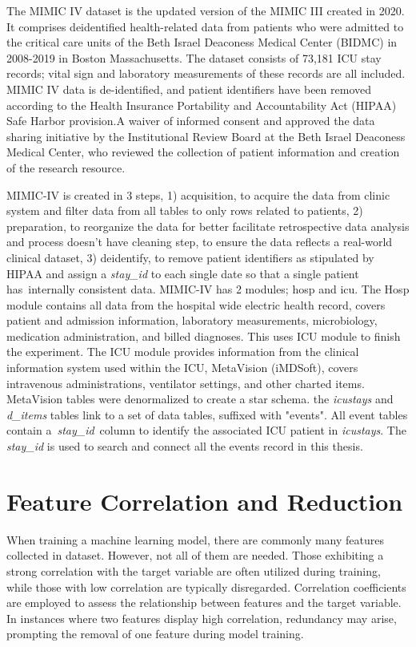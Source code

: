 \documentclass[12pt,a4paper,english
]{tunithesis}
\begin{document}
The MIMIC IV dataset is the updated version of the MIMIC III created in 2020. It comprises deidentified health-related data from patients who were admitted to the critical care units of the Beth Israel Deaconess Medical Center (BIDMC) in 2008-2019 in Boston Massachusetts. The dataset consists of 73,181 ICU stay records; vital sign and laboratory measurements of these records are all included. MIMIC IV data is de-identified, and patient identifiers have been removed according to the Health Insurance Portability and Accountability Act (HIPAA) Safe Harbor provision.A waiver of informed consent and approved the data sharing initiative by the Institutional Review Board at the Beth Israel Deaconess Medical Center, who reviewed the collection of patient information and creation of the research resource. \parencite{johnson2023}

MIMIC-IV is created in 3 steps, 1) acquisition, to acquire the data from clinic system and filter data from all tables to only rows related to patients, 2) preparation, to reorganize the data for better facilitate retrospective data analysis and process doesn't have cleaning step, to ensure the data reflects a real-world clinical dataset, 3) deidentify, to remove patient identifiers as stipulated by HIPAA and assign a \textit{stay\_id} to each single date so that a single patient has internally consistent data. MIMIC-IV has 2 modules; hosp and icu. The Hosp module contains all data from the hospital wide electric health record, covers patient and admission information, laboratory measurements, microbiology, medication administration, and billed diagnoses. This uses ICU module to finish the experiment. The ICU module provides information from the clinical information system used within the ICU, MetaVision (iMDSoft), covers intravenous administrations, ventilator settings, and other charted items. MetaVision tables were denormalized to create a star schema. the \textit{icustays} and \textit{d\_items} tables link to a set of data tables,  suffixed with "events". All event tables contain a \textit{stay\_id} column to identify the associated ICU patient in \textit{icustays}. The \textit{stay\_id} is used to search and connect all the events record in this thesis. 

\section{Feature Correlation and Reduction}
When training a machine learning model, there are commonly many features collected in dataset. However, not all of them are needed. Those exhibiting a strong correlation with the target variable are often utilized during training, while those with low correlation are typically disregarded. Correlation coefficients are employed to assess the relationship between features and the target variable. In instances where two features display high correlation, redundancy may arise, prompting the removal of one feature during model training.
\end{document}
